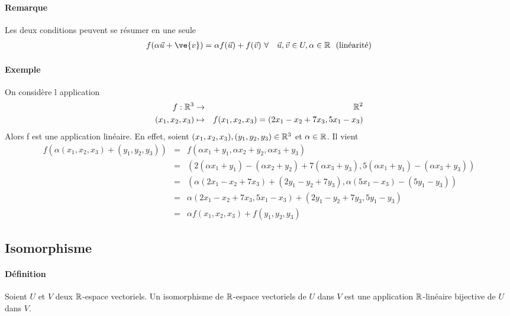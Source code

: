 \paragraph{Remarque} Les deux conditions peuvent se résumer en une seule
  \begin{eqnarray*}
    f(\alpha \vec{u} + \ve{v}) = \alpha f(\vec{u}) + f(\vec{v}) ~ &\forall&\vec{u}, \vec{v} \in U, \alpha \in \R \mbox{~ (linéarité)}
  \end{eqnarray*}

\paragraph{Exemple} On considère l application 
\begin{eqnarray*}
f: \mathbb{R}^3 &\rightarrow &\mathbb{R}^2 \\
(x_1, x_2, x_3)&\mapsto &f(x_1, x_2, x_3)=(2x_1-x_2+7x_3, 5x_1-x_3)
\end{eqnarray*}
Alors f est une application linéaire. En effet, soient $(x_1, x_2, x_3), (y_1, y_2, y_3) \in \mathbb{R}^3$ et $\alpha \in \mathbb{R}$. Il vient
\begin{eqnarray*}
f(\alpha(x_1, x_2, x_3)+ (y_1, y_2, y_3))&=&f(\alpha x_1+y_1, \alpha x_2+y_2, \alpha x_3+y_3)\\
&=&(2(\alpha x_1+y_1)-( \alpha x_2+y_2)+7(\alpha x_3+y_3), 5(\alpha x_1+y_1)-( \alpha x_3+y_3))\\
&=&(\alpha(2x_1-x_2+7x_3)+(2y_1-y_2+7y_3), \alpha(5x_1-x_3)-(5y_1-y_3))\\
&=&\alpha(2x_1-x_2+7x_3, 5x_1-x_3)+(2y_1-y_2+7y_3,5 y_1-y_3)\\
&=&\alpha f(x_1, x_2, x_3)+f (y_1, y_2, y_3)
\end{eqnarray*}


%
\subsection{Isomorphisme}
%
\paragraph{Définition} Soient $U$ et $V$ deux $\mathbb{R}$-espace vectoriels. Un isomorphisme de $\mathbb{R}$-espace vectoriels de $U$ dans $V$ est une application $\mathbb{R}$-linéaire bijective de $U$ dans $V$. 


